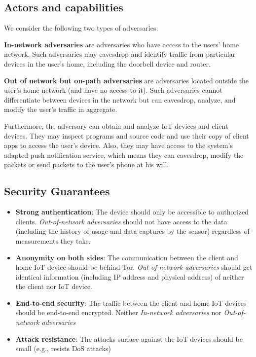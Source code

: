 \subsection{Actors and capabilities}
We consider the following two types of adversaries:

\textbf{In-network adversaries} are adversaries who have access to the users' home network. Such adversaries may eavesdrop and identify traffic from particular devices in the user's home, including the doorbell device and router.


\textbf{Out of network but on-path adversaries} are adversaries located outside the user's home network (and have no access to it). Such adversaries cannot differentiate between devices in the network but can eavesdrop, analyze, and modify the user’s traffic in aggregate. 

Furthermore, the adversary can obtain and analyze IoT devices and client devices. They may inspect programs and source code and use their copy of client apps to access the user's device. Also, they may have access to the system's adapted push notification service, which means they can eavesdrop, modify the packets or send packets to the user's phone at his will.
\subsection{Security Guarantees}

\begin{itemize}
	\item \textbf{Strong authentication}: The device should only be accessible to authorized clients. \textit{Out-of-network adversaries} should not have access to the data (including the history of usage and data captures by the sensor) regardless of measurements they take.
	\item \textbf{Anonymity on both sides}: The communication between the client and home IoT device should be behind Tor. \textit{Out-of-network adversaries} should  get identical information (including IP address and physical address) of neither the client nor IoT device.
	\item \textbf{End-to-end security}: The traffic between the client and home IoT devices should be end-to-end encrypted. Neither \textit{In-network adversaries} nor \textit{Out-of-network adversaries} 
	\item \textbf{Attack resistance}: The attacks surface against the IoT devices should be small (e.g., resists DoS attacks)
\end{itemize}

